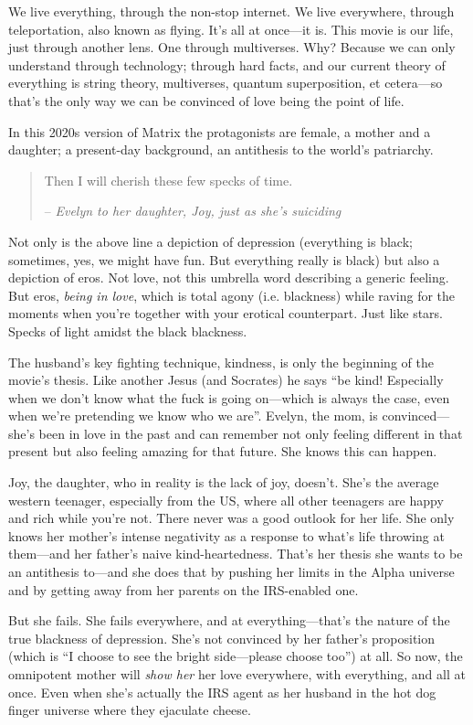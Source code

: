 We live everything, through the non-stop internet. We live everywhere, through teleportation, also known as flying. It’s all at once—it is. This movie is our life, just through another lens. One through multiverses. Why? Because we can only understand through technology; through hard facts, and our current theory of everything is string theory, multiverses, quantum superposition, et cetera—so that’s the only way we can be convinced of love being the point of life.

In this 2020s version of Matrix the protagonists are female, a mother and a daughter; a present-day background, an antithesis to the world’s patriarchy.

\begin{quote}
    Then I will cherish these few specks of time.

    – \emph{Evelyn to her daughter, Joy, just as she’s suiciding}
\end{quote}

Not only is the above line a depiction of depression (everything is black; sometimes, yes, we might have fun. But everything really is black) but also a depiction of eros. Not love, not this umbrella word describing a generic feeling. But eros, \emph{being in love}, which is total agony (i.e. blackness) while raving for the moments when you’re together with your erotical counterpart. Just like stars. Specks of light amidst the black blackness.

The husband’s key fighting technique, kindness, is only the beginning of the movie’s thesis. Like another Jesus (and Socrates) he says “be kind! Especially when we don’t know what the fuck is going on—which is always the case, even when we’re pretending we know who we are”. Evelyn, the mom, is convinced—she’s been in love in the past and can remember not only feeling different in that present but also feeling amazing for that future. She knows this can happen.

Joy, the daughter, who in reality is the lack of joy, doesn’t. She’s the average western teenager, especially from the US, where all other teenagers are happy and rich while you’re not. There never was a good outlook for her life. She only knows her mother’s intense negativity as a response to what’s life throwing at them—and her father’s naive kind-heartedness. That’s her thesis she wants to be an antithesis to—and she does that by pushing her limits in the Alpha universe and by getting away from her parents on the IRS-enabled one.

But she fails. She fails everywhere, and at everything—that’s the nature of the true blackness of depression. She’s not convinced by her father’s proposition (which is “I choose to see the bright side—please choose too”) at all. So now, the omnipotent mother will \emph{show her} her love everywhere, with everything, and all at once. Even when she’s actually the IRS agent as her husband in the hot dog finger universe where they ejaculate cheese.

